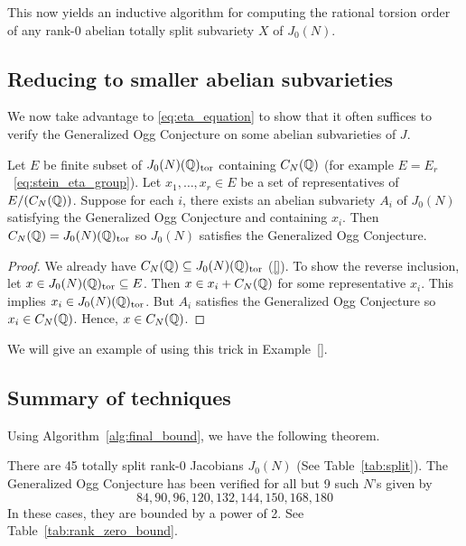 This now yields an inductive algorithm for computing the rational torsion order
of any rank-0 abelian totally split subvariety $X$ of $J_0(N)$.

\subsection{Reducing to smaller abelian subvarieties}%
\label{sub:reducing_to_smaller_abelian_subvarieties}

We now take advantage to \eqref{eq:eta_equation} to show that it often suffices
to verify the Generalized Ogg Conjecture on some abelian subvarieties of $J$.
\begin{proposition}
    Let $E$ be finite subset of $J_0(N)(\mathbb{Q})_{\mathrm{tor}}$ containing $C_N(\mathbb{Q})$ (for
    example $E=E_r$~\eqref{eq:stein_eta_group}). Let $x_1,\ldots,x_r\in E$ be a
    set of representatives of $E/(C_N(\mathbb{Q}))$. Suppose for each $i$, there
    exists an abelian subvariety $A_i$ of $J_0(N)$ satisfying the Generalized
    Ogg Conjecture and containing $x_i$. Then $C_N(\mathbb{Q})=J_0(N)(\mathbb{Q})_{\mathrm{tor}}$ so
    $J_0(N)$ satisfies the Generalized Ogg Conjecture.
\end{proposition}
\begin{proof}
    We already have $C_N(\mathbb{Q})\subseteq J_0(N)(\mathbb{Q})_{\mathrm{tor}}$ (\ref{}). To show the
    reverse inclusion, let $x\in J_0(N)(\mathbb{Q})_{\mathrm{tor}}\subseteq E$. Then $x\in
    x_i+C_N(\mathbb{Q})$ for some representative $x_i$. This implies $x_i\in
    J_0(N)(\mathbb{Q})_{\mathrm{tor}}$. But $A_i$ satisfies the Generalized Ogg Conjecture so
    $x_i\in C_N(\mathbb{Q})$. Hence, $x\in C_N(\mathbb{Q})$.
\end{proof}

We will give an example of using this trick in Example~\ref{}.

\subsection{Summary of techniques}%
\label{sub:summary_of_techniques} 

Using Algorithm~\ref{alg:final_bound}, we have the following theorem.
\begin{theorem}%
    \label{thm:verification_rank_zero}
    There are 45 totally split rank-0 Jacobians $J_0(N)$ (See
    Table~\ref{tab:split}). The Generalized Ogg Conjecture has been verified
    for all but 9 such $N$'s given by
    \[
        84,90,96,120,132,144,150,168,180
    \]
    In these cases, they are bounded by a power of 2. See
    Table~\ref{tab:rank_zero_bound}.
\end{theorem}

